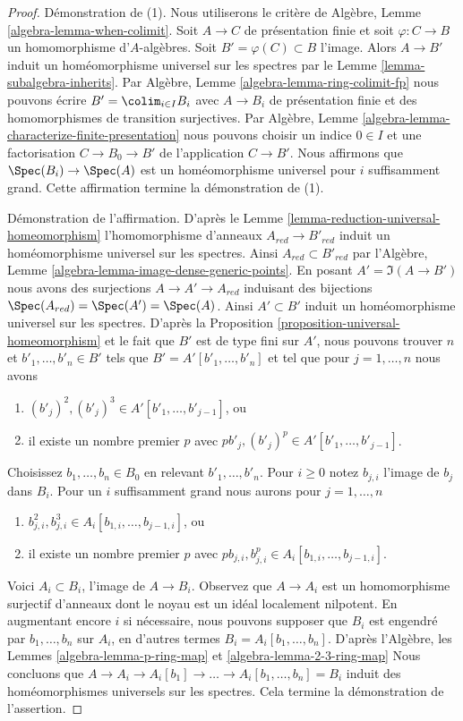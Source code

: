 \begin{proof}
Démonstration de (1). Nous utiliserons le critère
de Algèbre, Lemme \ref{algebra-lemma-when-colimit}. Soit
$A \to C$ de présentation finie et soit $\varphi : C \to B$ un homomorphisme
d'$A$-algèbres. Soit $B' = \varphi(C) \subset B$ l'image.
Alors $A \to B'$ induit un homéomorphisme universel sur
les spectres par le Lemme \ref{lemma-subalgebra-inherits}.
Par Algèbre, Lemme \ref{algebra-lemma-ring-colimit-fp} nous pouvons
écrire $B' = \colim_{i \in I} B_i$ avec $A \to B_i$
de présentation finie et des homomorphismes
de transition
surjectives. Par Algèbre, Lemme \ref{algebra-lemma-characterize-finite-presentation} nous pouvons choisir
un indice $0 \in I$
et une factorisation $C \to B_0 \to B'$ de l'application $C \to B'$. Nous affirmons
que $\Spec(B_i) \to \Spec(A)$ est un homéomorphisme universel pour $i$ suffisamment
grand. Cette affirmation termine la démonstration de (1).

\medskip\noindent
Démonstration de l'affirmation. D'après le Lemme \ref{lemma-reduction-universal-homeomorphism} l'homomorphisme
d'anneaux $A_{red} \to B'_{red}$ induit un homéomorphisme
universel sur les spectres. Ainsi $A_{red} \subset B'_{red}$
par l'Algèbre, Lemme \ref{algebra-lemma-image-dense-generic-points}. En posant
$A' = \Im(A \to B')$ nous avons des surjections $A \to A' \to A_{red}$ induisant
des bijections $\Spec(A_{red}) = \Spec(A') = \Spec(A)$. Ainsi $A' \subset B'$ induit
un homéomorphisme universel sur les spectres. D'après
la Proposition \ref{proposition-universal-homeomorphism} et le fait que $B'$
est de type fini sur $A'$, nous
pouvons trouver $n$ et $b'_1, \ldots, b'_n \in B'$
tels que $B' = A'[b'_1, \ldots, b'_n]$
et tel que pour $j = 1, \ldots, n$ nous avons
\begin{enumerate}
\item $(b'_j)^2, (b'_j)^3 \in A'[b'_1, \ldots, b'_{j - 1}]$, ou
\item il existe un nombre premier
$p$ avec $pb'_j, (b'_j)^p \in A'[b'_1, \ldots, b'_{j - 1}]$.
\end{enumerate}
Choisissez $b_1, \ldots, b_n \in B_0$ en relevant $b'_1, \ldots, b'_n$. Pour $i \geq 0$ notez
$b_{j, i}$ l'image de $b_j$ dans $B_i$. Pour un $i$
suffisamment grand nous aurons pour $j = 1, \ldots, n$
\begin{enumerate}
\item $b_{j, i}^2, b_{j, i}^3 \in A_i[b_{1, i}, \ldots, b_{j - 1, i}]$, ou
\item il existe un nombre
premier $p$ avec $pb_{j, i}, b_{j, i}^p \in A_i[b_{1, i}, \ldots, b_{j - 1, i}]$.
\end{enumerate}
Voici $A_i \subset B_i$, l'image de $A \to B_i$. Observez que $A \to A_i$ est un
homomorphisme surjectif d'anneaux dont le noyau est un idéal
localement nilpotent. En augmentant encore $i$ si
nécessaire, nous pouvons supposer que $B_i$ est engendré
par $b_1, \ldots, b_n$ sur $A_i$,
en d'autres termes $B_i = A_i[b_1, \ldots, b_n]$. D'après
l'Algèbre, les Lemmes \ref{algebra-lemma-p-ring-map} et \ref{algebra-lemma-2-3-ring-map}
Nous concluons que $A \to A_i \to A_i[b_1] \to \ldots \to A_i[b_1, \ldots, b_n] = B_i$ induit des homéomorphismes universels
sur les spectres. Cela termine la démonstration de
l'assertion.


\end{proof}
